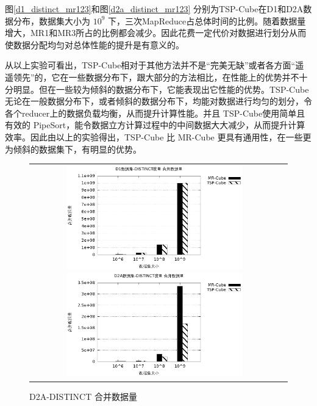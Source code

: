 图\ref{d1_distinct_mr123}和图\ref{d2a_distinct_mr123} 分别为TSP-Cube在D1和D2A数据分布，数据集大小为 ${10}^{9}$ 下，三次MapReduce占总体时间的比例。随着数据量增大，MR1和MR3所占的比例都会减少。因此花费一定代价对数据进行划分从而使数据分配均匀对总体性能的提升是有意义的。

从以上实验可看出，TSP-Cube相对于其他方法并不是``完美无缺”或者各方面``遥遥领先”的，它在一些数据分布下，跟大部分的方法相比，在性能上的优势并不十分明显。但在一些较为倾斜的数据分布下，它能表现出它性能的优势。TSP-Cube 无论在一般数据分布下，或者倾斜的数据分布下，均能对数据进行均匀的划分，令各个reducer上的数据负载均衡，从而提升计算性能。并且 TSP-Cube使用简单且有效的 PipeSort，能令数据立方计算过程中的中间数据大大减少，从而提升计算效率。因此由以上的实验得出，TSP-Cube 比 MR-Cube 更具有通用性，在一些更为倾斜的数据集下，有明显的优势。





\begin{figure}[!ht]
\begin{tabular}{cc}

\begin{minipage}[t]{0.5\textwidth}
\centering\includegraphics[width=3in]{picture/ch_experiment_gnuplot_eps/d1_distinct_interdata} 
\caption{D1-DISTINCT 合并数据量}\label{d1_distinct_interdata} 
\end{minipage}

\begin{minipage}[t]{0.5\textwidth}
\centering\includegraphics[width=3in]{picture/ch_experiment_gnuplot_eps/d2a_distinct_interdata} 
\caption{D2A-DISTINCT 合并数据量}\label{d2a_distinct_interdata} 
\end{minipage}

\end{tabular}
\end{figure}



